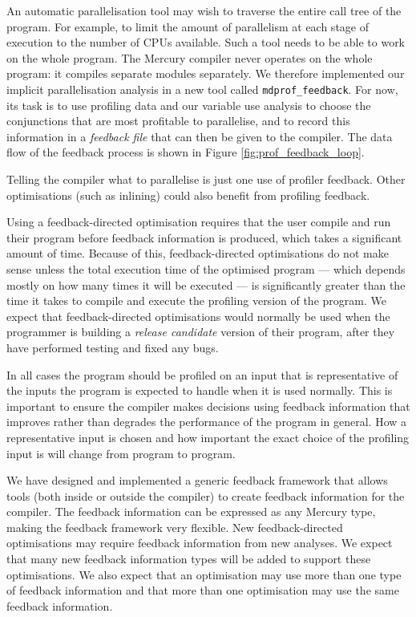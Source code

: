 An automatic parallelisation tool
may wish to traverse the entire call tree of the program.
For example, to limit the amount of parallelism at each stage of execution
to the number of CPUs available.
Such a tool needs to be able to work on the whole program.
The Mercury compiler never operates on the whole program:
it compiles separate modules separately.
We therefore implemented our implicit parallelisation analysis in a new tool called
\texttt{mdprof\_feedback}.
For now, its task is to use profiling data and our variable use analysis
to choose the conjunctions that are most profitable to parallelise,
and to record this information in a \emph{feedback file}
that can then be given to the compiler.
The data flow of the feedback process is shown in Figure
\ref{fig:prof_feedback_loop}.


Telling the compiler what to parallelise is just one use of profiler feedback.
Other optimisations (such as inlining) could also benefit
from profiling feedback.

Using a feedback-directed optimisation requires that the user compile
and run their program before feedback information is produced, 
which takes a significant amount of time.
Because of this, feedback-directed optimisations do not make sense
unless
the total execution time of the optimised program --- which depends
mostly on how many times it will be executed --- is significantly
greater than the time it takes to compile and execute the profiling
version of the program.
We expect that feedback-directed optimisations would normally be used
when the programmer is building a \emph{release candidate} version of their
program, after they have performed testing and fixed any bugs.

In all cases the program should be profiled on an input that is
representative of the inputs the program is expected to handle when
it is used normally.
This is important to ensure the compiler makes decisions using
feedback information that improves rather than degrades the performance
of the program in general.
How a representative input is chosen and how important the exact choice
of the profiling input is will change from program to program.

We have designed and implemented a generic feedback framework that allows
tools (both inside or outside the compiler)
to create feedback information for the compiler.
The feedback information can be expressed as any Mercury type, making the
feedback framework very flexible.
New feedback-directed optimisations may require feedback information
from new analyses.
We expect that many new feedback information types will be added to
support these optimisations.
We also expect that an optimisation may use more than one type of
feedback information and that more than one optimisation may use the
same feedback information.


